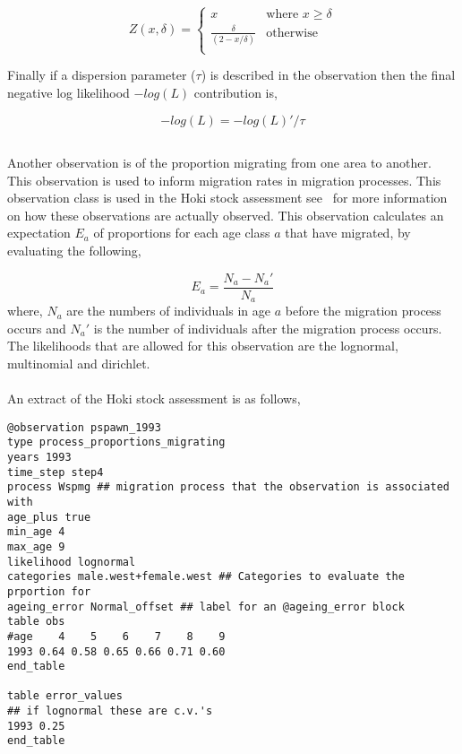 {{{{\[ Z(x,\delta) =
\begin{cases}
x       & \text{where } x \geq \delta\\
\frac{\delta}{(2 - x / \delta)}  & \text{otherwise}\\
\end{cases}
\]

Finally if a dispersion parameter ($\tau$) is described in the observation then the final negative log likelihood $-log(L)$ contribution is,

$$-log(L) = -log(L)' / \tau$$


\subsection{\label{sec:Proportions-migrating}}
Another observation is of the proportion migrating from one area to another. This observation is used to inform migration rates in migration processes. This observation class is used in the Hoki stock assessment see~\cite{francis_03} for more information on how these observations are actually observed. This observation calculates an expectation $E_a$ of proportions for each age class $a$ that have migrated, by evaluating the following,

\begin{equation}
E_a = \frac{N_a - N_a'}{N_a}
\end{equation}
where, $N_a$ are the numbers of individuals in age $a$ before the migration process occurs and $N_a'$ is the number of individuals after the migration process occurs.
\\
The likelihoods that are allowed for this observation are the lognormal, multinomial and dirichlet.
\\\\
An extract of the Hoki stock assessment is as follows,
{\small{\begin{verbatim}
@observation pspawn_1993
type process_proportions_migrating
years 1993
time_step step4
process Wspmg ## migration process that the observation is associated with
age_plus true
min_age 4
max_age 9
likelihood lognormal
categories male.west+female.west ## Categories to evaluate the prportion for
ageing_error Normal_offset ## label for an @ageing_error block
table obs
#age    4    5    6    7    8    9
1993 0.64 0.58 0.65 0.66 0.71 0.60
end_table

table error_values
## if lognormal these are c.v.'s
1993 0.25
end_table
\end{verbatim}}}


}}}}
